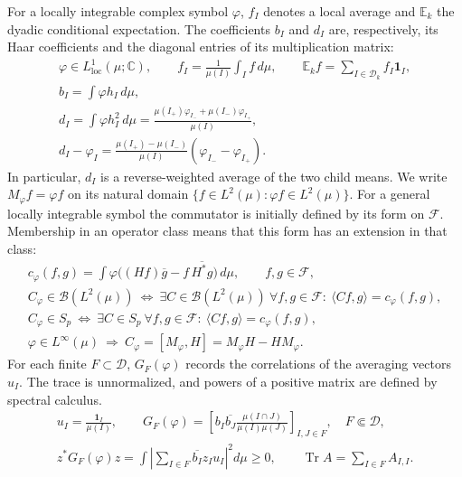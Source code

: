 \documentclass[11pt]{amsart}
\newcommand{\D}{\mathcal D}
\newcommand{\tr}{\operatorname{Tr}}
\newcommand{\ip}[2]{\langle #1,#2\rangle}
\newcommand{\fin}{\Subset}
\begin{document}
For a locally integrable complex symbol $\varphi$, $f_I$ denotes a
local average and $\mathbb E_k$ the dyadic conditional expectation.
The coefficients $b_I$ and $d_I$ are, respectively, its Haar
coefficients and the diagonal entries of its multiplication matrix:
\begin{equation}\label{data}
 \begin{gathered}
 \varphi\in L^1_{\mathrm{loc}}(\mu;\mathbb C),\qquad
 f_I=\frac1{\mu(I)}\int_If\,d\mu,\qquad
 \mathbb E_kf=\sum_{I\in\D_k}f_I\mathbf1_I,\\
 b_I=\int\varphi h_I\,d\mu,\\
 d_I=\int\varphi h_I^2\,d\mu
     =\frac{\mu(I_+)\varphi_{I_-}+\mu(I_-)\varphi_{I_+}}{\mu(I)},\\
 d_I-\varphi_I
   =\frac{\mu(I_+)-\mu(I_-)}{\mu(I)}
                     (\varphi_{I_-}-\varphi_{I_+}).
 \end{gathered}
\end{equation}
In particular, $d_I$ is a reverse-weighted average of the two child
means. We write $M_\varphi f=\varphi f$ on its natural domain
$\{f\in L^2(\mu):\varphi f\in L^2(\mu)\}$. For a general locally
integrable symbol the commutator is initially defined by its form on
$\mathscr F$. Membership in an operator class means that this form
has an extension in that class:
\begin{equation}\label{form}
 \begin{gathered}
 c_\varphi(f,g)=\int\varphi\big((Hf)\overline g
                          -f\,\overline{H^*g}\big)\,d\mu,
                          \qquad f,g\in\mathscr F,\\
 C_\varphi\in\mathcal B(L^2(\mu))
 \ \Longleftrightarrow\
 \exists C\in\mathcal B(L^2(\mu))\ 
 \forall f,g\in\mathscr F:\ \ip{Cf}{g}=c_\varphi(f,g),\\
 C_\varphi\in S_p
 \ \Longleftrightarrow\
 \exists C\in S_p\ 
 \forall f,g\in\mathscr F:\ \ip{Cf}{g}=c_\varphi(f,g),\\
 \varphi\in L^\infty(\mu)
 \ \Longrightarrow\
 C_\varphi=[M_\varphi,H]=M_\varphi H-HM_\varphi.
 \end{gathered}
\end{equation}
For each finite $F\subset\D$, $G_F(\varphi)$ records the correlations
of the averaging vectors $u_I$. The trace is unnormalized, and powers
of a positive matrix are defined by spectral calculus.
\begin{equation}\label{gram}
 \begin{gathered}
 u_I=\frac{\mathbf1_I}{\mu(I)},\qquad
 G_F(\varphi)=\left[b_I\overline{b_J}
              \frac{\mu(I\cap J)}{\mu(I)\mu(J)}\right]_{I,J\in F},
              \quad F\fin\D,\\
 z^*G_F(\varphi)z
 =\int\left|\sum_{I\in F}\overline{b_I}z_Iu_I\right|^2d\mu\ge0,\qquad
 \tr A=\sum_{I\in F}A_{I,I}.
 \end{gathered}
\end{equation}
\end{document}
